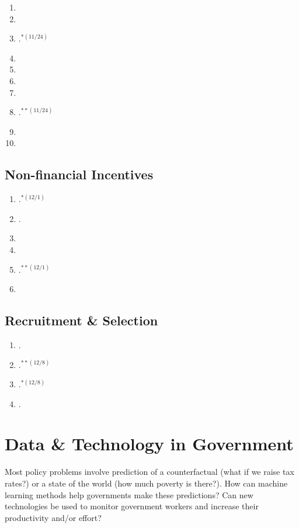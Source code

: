 \documentclass[11pt]{article}
\begin{document}
\begin{enumerate}
\item {}
\item {}
\item {}.$^{*(11/24)}$
\item {}
\item {}
\item {}
\item {}
\item \textbf{}.$^{**(11/24)}$
\item {}
\item {}
\end{enumerate}

\subsection{Non-financial Incentives}

\begin{enumerate}
\item {}.$^{*(12/1)}$
\item {}.
\item {}
\item {}
\item \textbf{}.$^{**(12/1)}$
\item {}
\end{enumerate}

\subsection{Recruitment \& Selection}

\begin{enumerate}
\item {}.
\item \textbf{}.$^{**(12/8)}$
\item {}.$^{*(12/8)}$
\item {}.
\end{enumerate}

\section{Data \& Technology in Government}
Most policy problems involve prediction of a counterfactual (what if we raise tax rates?) or a state of the world (how much poverty is there?). How can machine learning methods help governments make these predictions? Can new technologies be used to monitor government workers and increase their productivity and/or effort?
\end{document}
